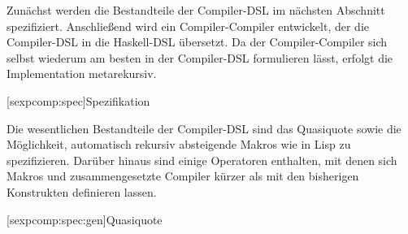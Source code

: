 \documentclass[12pt, a4paper, bibgerm]{scrbook}
\newcommand\lsection{}
\newcommand\lsubsection{}
\begin{document}
Zunächst werden die Bestandteile der Compiler-DSL im nächsten Abschnitt
spezifiziert. Anschließend wird ein Compiler-Compiler entwickelt, der
die Compiler-DSL in die Haskell-DSL übersetzt. Da der Compiler-Compiler
sich selbst wiederum am besten in der Compiler-DSL formulieren lässt,
erfolgt die Implementation metarekursiv.

\lsection[sexpcomp:spec]{Spezifikation}

Die wesentlichen Bestandteile der Compiler-DSL sind das Quasiquote sowie
die Möglichkeit, automatisch rekursiv absteigende Makros wie in Lisp zu
spezifizieren. Darüber hinaus sind einige Operatoren enthalten, mit
denen sich Makros und zusammengesetzte Compiler kürzer als mit den
bisherigen Konstrukten definieren lassen.

\lsubsection[sexpcomp:spec:gen]{Quasiquote}
\end{document}
